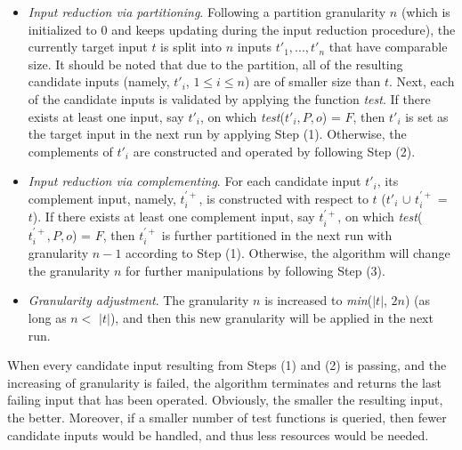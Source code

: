 \begin{itemize}
\item[(1)] \emph{Input reduction via partitioning}. 
Following a partition granularity $n$ (which is initialized to $0$ and keeps updating during the input reduction procedure), the currently target input $t$ is split into $n$ inputs $t'_1,...,t'_n$ that have comparable size. %
It should be noted that due to the partition, all of the resulting candidate inputs (namely, $t'_i$, $1\le i\le n$) are of smaller size than $t$.
Next, each of the candidate inputs is validated by applying the function \emph{test}. 
If there exists at least one input, say $t'_i$, on which  \emph{test}($t'_i, P, o$) = $F$, then $t'_i$ is set as the target input in the next run by applying Step (1).
Otherwise, the complements of $t'_i$ are constructed and operated by following Step (2).

\item[(2)] \emph{Input reduction via complementing}.
For each candidate input $t'_i$, its complement input, namely, $t^{'+}_i$, is constructed with respect to $t$ ($t'_i$ $\cup$ $t^{'+}_i$ = $t$). 
If there exists at least one complement input, say $t^{'+}_i$, on which \emph{test}($t^{'+}_i, P, o$) = $F$, then $t^{'+}_i$ is further partitioned in the next run with granularity $n - 1$ according to Step (1).
Otherwise, the algorithm will change the granularity $n$ for further manipulations by following Step (3).

\item[(3)] \emph{Granularity adjustment}.
The granularity $n$ is increased to \emph{min}($|t|$, $2$$n$) (as long as $n <$ $|t|$), and then this new granularity will be applied in the next run.
\end{itemize}

\noindent
When every candidate input resulting from Steps (1) and (2) is passing, and the increasing of granularity is failed, the algorithm terminates and returns
the last failing input that has been operated.
Obviously, the smaller the resulting input, the better.
Moreover, if a smaller number of test functions is queried, then fewer candidate inputs would be handled, and thus less resources would be needed.




